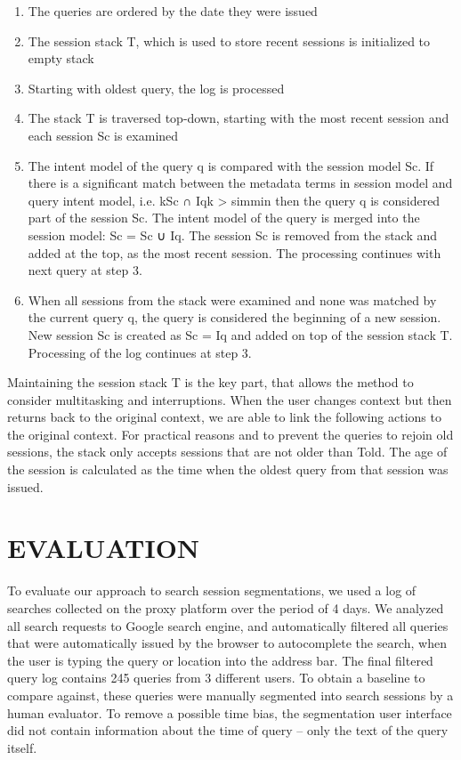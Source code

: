 \documentclass{acm_proc_article-sp} %
\begin{document}
\begin{enumerate} 
	\item The queries are ordered by the date they were issued
	\item The session stack T, which is used to store recent sessions
	is initialized to empty stack
	\item  Starting with oldest query, the log is processed
	\item  The stack T is traversed top-down, starting with the
	most recent session and each session Sc is examined
	\item  The intent model of the query q is compared with the
	session model Sc. If there is a significant match between
	the metadata terms in session model and query
	intent model, i.e.
	kSc ∩ Iqk > simmin
	then the query q is considered part of the session Sc.
	The intent model of the query is merged into the session
	model:
	 Sc = Sc ∪ Iq.  
	The session Sc is removed
	from the stack and added at the top, as the most recent
	session. The processing continues with next query
	at step 3.
	\item When all sessions from the stack were examined and
	none was matched by the current query q, the query is
	considered the beginning of a new session. New session
	Sc is created as Sc = Iq and added on top of the session
	stack T. Processing of the log continues at step 3.
\end{enumerate}

Maintaining the session stack T is the key part, that allows
the method to consider multitasking and interruptions.
When the user changes context but then returns back to the
original context, we are able to link the following actions to
the original context. For practical reasons and to prevent
the queries to rejoin old sessions, the stack only accepts sessions
that are not older than Told. The age of the session
is calculated as the time when the oldest query from that
session was issued.

\section{EVALUATION}

To evaluate our approach to search session segmentations,
we used a log of searches collected on the proxy platform
over the period of 4 days. We analyzed all search requests to
Google search engine, and automatically filtered all queries
that were automatically issued by the browser to autocomplete
the search, when the user is typing the query or location
into the address bar. The final filtered query log contains
245 queries from 3 different users. To obtain a baseline
to compare against, these queries were manually segmented
into search sessions by a human evaluator. To remove a
possible time bias, the segmentation user interface did not
contain information about the time of query – only the text
of the query itself.
\end{document}
